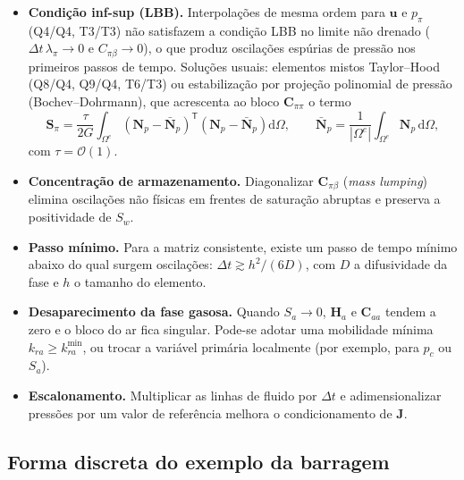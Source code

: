 \documentclass[11pt,a4paper]{article}
\newcommand{\dd}{\mathrm{d}}
\begin{document}
\begin{itemize}
\item \textbf{Condição inf-sup (LBB).} Interpolações de mesma ordem para
$\mathbf u$ e $p_\pi$ (Q4/Q4, T3/T3) não satisfazem a condição LBB no
limite não drenado ($\Delta t\,\lambda_\pi\to0$ e $C_{\pi\beta}\to0$), o que
produz oscilações espúrias de pressão nos primeiros passos de tempo.
Soluções usuais: elementos mistos Taylor--Hood (Q8/Q4, Q9/Q4, T6/T3) ou
estabilização por projeção polinomial de pressão
(Bochev--Dohrmann), que acrescenta ao bloco $\mathbf C_{\pi\pi}$ o termo
\begin{equation*}
\mathbf S_\pi=\frac{\tau}{2G}\int_{\Omega^e}\left(\mathbf N_p-\bar{\mathbf N}_p\right)^{\mathsf T}\left(\mathbf N_p-\bar{\mathbf N}_p\right)\dd\Omega,
\qquad \bar{\mathbf N}_p=\frac{1}{|\Omega^e|}\int_{\Omega^e}\mathbf N_p\,\dd\Omega,
\end{equation*}
com $\tau=\mathcal O(1)$.
\item \textbf{Concentração de armazenamento.} Diagonalizar $\mathbf C_{\pi\beta}$
(\emph{mass lumping}) elimina oscilações não físicas em frentes de
saturação abruptas e preserva a positividade de $S_w$.
\item \textbf{Passo mínimo.} Para a matriz consistente, existe um passo de
tempo mínimo abaixo do qual surgem oscilações:
$\Delta t\gtrsim h^2/(6D)$, com $D$ a difusividade da fase e $h$ o tamanho
do elemento.
\item \textbf{Desaparecimento da fase gasosa.} Quando $S_a\to0$, $\mathbf H_a$
e $\mathbf C_{aa}$ tendem a zero e o bloco do ar fica singular. Pode-se
adotar uma mobilidade mínima $k_{ra}\geq k_{ra}^{\min}$, ou trocar a
variável primária localmente (por exemplo, para $p_c$ ou $S_a$).
\item \textbf{Escalonamento.} Multiplicar as linhas de fluido por $\Delta t$
e adimensionalizar pressões por um valor de referência melhora o
condicionamento de $\mathbf J$.
\end{itemize}

\subsection{Forma discreta do exemplo da barragem}
\end{document}
